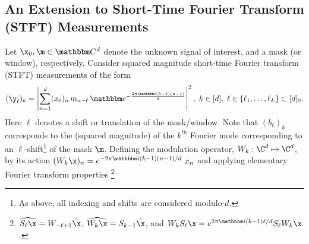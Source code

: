 \subsection{An Extension to Short-Time Fourier Transform (STFT) Measurements}
\label{sec:STFT}
%
%
Let $\x_0, \m \in \mathbbm C^d$ denote the unknown signal of
interest, and a mask (or window), respectively.  Consider squared magnitude short-time Fourier
transform (STFT) measurements of the form 
%
\begin{equation}
  ({\y_\ell})_k = \left \vert \sum_{n=1}^d (x_0)_n \, m_{n-\ell} \,
      \mathbbm e^{-\frac{2\pi \mathbbm i (k-1) (n-1)}d} 
      \right \vert^2, ~ k \in [d],
      ~ \ell \in \{\ell_1, \dots, \ell_L\} \subset 
        [d]_0.
  \label{eq:STFT_measurements}
\end{equation}
%
Here $\ell$ denotes a shift or translation of the mask/window.
Note that $({b_\ell})_k$ corresponds to the (squared magnitude) of the
$k^{th}$ Fourier mode corresponding to an
$\ell$-shift\footnote{As above, all indexing and shifts are considered
modulo-$d$.} of the mask $\m$. Defining the modulation operator, $W_k: \C^d \mapsto \C^d$,  by its action $(W_k \x)_n = e^{-2\pi \mathbbm i (k-1)(n-1)/d}~x_n$ and applying elementary Fourier transform properties \footnote{$\widehat{S_\ell \x}=W_{-\ell+1}\hat{\x}$, $\widehat{W_k \x}=S_{k-1}\hat{\x}$, and $W_k S_\ell \x = e^{2\pi \mathbbm i (k-1)\ell/d} S_\ell W_k \x$.}
